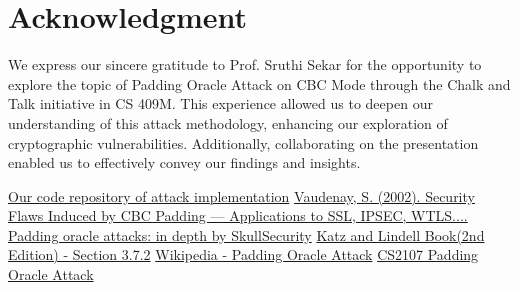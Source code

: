 \documentclass[conference]{IEEEtran}
\begin{document}
\section*{Acknowledgment}

We express our sincere gratitude to Prof. Sruthi Sekar for the opportunity to explore the topic of Padding Oracle Attack on CBC Mode through the Chalk and Talk initiative in CS 409M. This experience allowed us to deepen our understanding of this attack methodology, enhancing our exploration of cryptographic vulnerabilities. Additionally, collaborating on the presentation enabled us to effectively convey our findings and insights.

\begin{thebibliography}{00}
 \href{https://github.com/hsr-22/PaddingOracleAttack-CBC}{Our code repository of attack implementation}
 \href{https://doi.org/10.1007/3-540-46035-7_35}{Vaudenay, S. (2002). Security Flaws Induced by CBC Padding — Applications to SSL, IPSEC, WTLS....}
 \href{https://www.skullsecurity.org/2013/padding-oracle-attacks-in-depth}{Padding oracle attacks: in depth by SkullSecurity}
 \href{https://www.cs.umd.edu/~jkatz/imc2.html}{Katz and Lindell Book(2nd Edition) - Section 3.7.2}
 \href{https://en.wikipedia.org/wiki/Padding_oracle_attack}{Wikipedia - Padding Oracle Attack}
 \href{https://www.youtube.com/watch?v=4EgD4PEatA8}{CS2107 Padding Oracle Attack}

\end{thebibliography}
\end{document}
